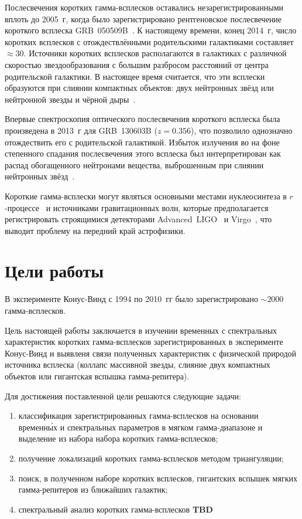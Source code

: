 Послесвечения коротких гамма-всплесков оставались незарегистрированными вплоть 
до 2005~г, когда было зарегистрировано рентгеновское послесвечение короткого 
всплеска GRB~050509B~\citep{Gehrels_2005Natur}. К настоящему времени, конец 2014~г, 
число коротких всплесков с отождествлёнными родительскими галактиками составляет $\approx 30$. 
Источники коротких всплесков располагаются в галактиках с различной скоростью 
звездообразования с большим разбросом расстояний от центра родительской галактики. 
В настоящее время считается, что эти всплески образуются при слиянии компактных 
объектов: двух нейтронных звёзд или нейтронной звезды и чёрной дыры~\citep[см. обзор][]{Berger_2014}.

Впервые спектроскопия оптического послесвечения короткого всплеска была произведена в 2013~г 
для GRB~130603B ($z = 0.356$), что позволило однозначно отождествить его с 
родительской галактикой. Избыток излучения во на фоне степенного спадания 
послесвечения этого всплеска был интерпретирован как распад обогащенного 
нейтронами вещества, выброшенным при слиянии нейтронных звёзд~\citep{Tanvir_2013Natur}. 

Короткие гамма-всплески могут являться основными местами нуклеосинтеза в 
$r$-процессе~\citep{Tanvir_2013Natur} и источниками гравитационных волн, 
которые предполагается регистрировать строящимися детекторами Advanced~LIGO~\citep{Harry_2010CQGra} 
и Virgo~\citep{Accadia_2012JInst}, что выводит проблему на передний край астрофизики.

\section{Цели работы}
В эксперименте Конус-Винд с 1994 по 2010~гг было зарегистрировано $\sim 2000$ гамма-всплесков. 

Цель настоящей работы заключается в изучении временных с спектральных характеристик 
коротких гамма-всплесков зарегистрированных в эксперименте Конус-Винд и выявленя 
связи полученных характеристик с физической природой источника всплеска 
(коллапс массивной звезды, слияние двух компактных объектов или гигантская вспышка гамма-репитера).

Для достижения поставленной цели решаются следующие задачи:
\begin{enumerate}
\item классификация зарегистрированных гамма-всплесков на основании временн\'{ы}х 
и спектральных параметров в мягком гамма-диапазоне и выделение из набора набора коротких гамма-всплесков; 
\item получение локализаций коротких гамма-всплесков методом триангуляции; 
\item поиск, в полученном наборе коротких всплесков, гигантских 
вспышек мягких гамма-репитеров из ближайших галактик;
\item спектральный анализ коротких гамма-всплесков \textbf{TBD}
\end{enumerate}

